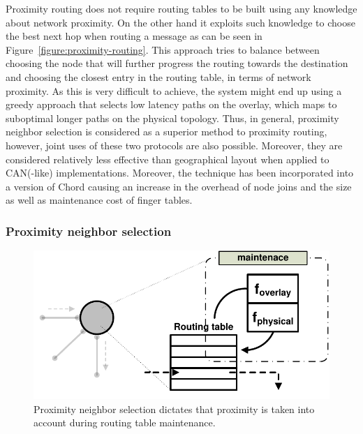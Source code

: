 Proximity routing does not require routing tables to be built using any
knowledge about network proximity. On the other hand it exploits such knowledge
to choose the best next hop when routing a message as can be seen in
Figure~\ref{figure:proximity-routing}. This approach tries to balance between
choosing the node that will further progress the routing towards the destination
and choosing the closest entry in the routing table, in terms of network
proximity. As this is very difficult to achieve, the system might end up
using a greedy approach that selects low latency paths on the overlay, which
maps to suboptimal longer paths on the physical topology. Thus, in general,
proximity neighbor selection is considered as a superior method to proximity
routing, however, joint uses of these two protocols are also possible. Moreover,
they are considered relatively less effective than geographical layout when
applied to CAN(-like) implementations. Moreover, the technique has been
incorporated into a version of Chord causing an increase in the overhead of node
joins and the size as well as maintenance cost of finger tables.

%
%

\subsubsection{Proximity neighbor selection}

\begin{figure}[ht]
\centering
  \includegraphics[scale=0.4]{img/pdf/proximity-neighbor-selection.pdf}
\caption{Proximity neighbor selection dictates that proximity is taken into
account during routing table maintenance.}
\label{figure:proximity-neighbour-selection}
\end{figure}

